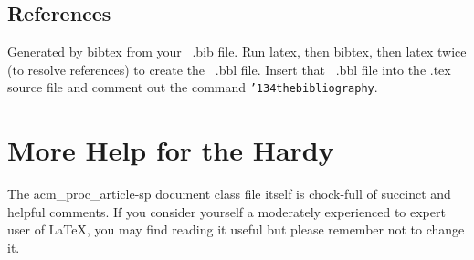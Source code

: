 \documentclass{acm_proc_article-sp-sigmod09}
\begin{document}
\subsection{References}
Generated by bibtex from your ~.bib file.  Run latex,
then bibtex, then latex twice (to resolve references)
to create the ~.bbl file.  Insert that ~.bbl file into
the .tex source file and comment out
the command \texttt{{\char'134}thebibliography}.
\section{More Help for the Hardy}
The acm\_proc\_article-sp document class file itself is chock-full of succinct
and helpful comments.  If you consider yourself a moderately
experienced to expert user of \LaTeX, you may find reading
it useful but please remember not to change it.

\end{document}
